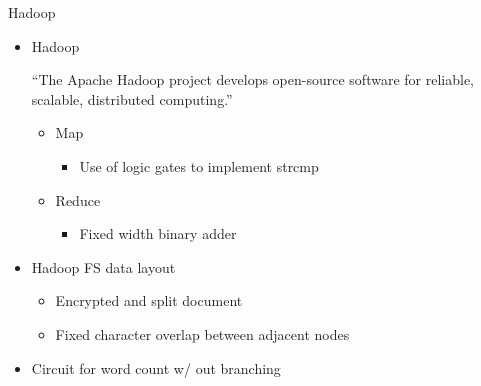 \documentclass[dvips,11pt]{beamer}
\begin{document}
\begin{frame}{Hadoop}
  \begin{itemize}
  \item Hadoop 

      ``The Apache Hadoop project develops open-source software for reliable, scalable, distributed computing.''

    \begin{itemize}
    \item Map 
      \begin{itemize}
        \item Use of logic gates to implement strcmp
      \end{itemize}
    \item Reduce 
      \begin{itemize}
      \item Fixed width binary adder
      \end{itemize}
      
    \end{itemize} 
  \item Hadoop FS data layout
    \begin{itemize}
      \item Encrypted and split document
      \item Fixed character overlap between adjacent nodes
    \end{itemize}
  \item Circuit for word count w/ out branching 
  \end{itemize} 
\end{frame}
\end{document}
